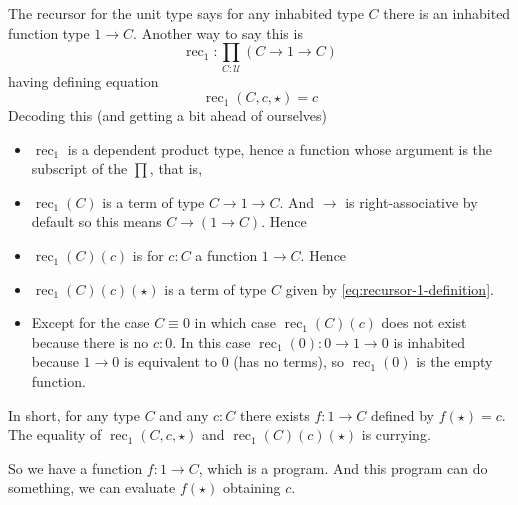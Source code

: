 \documentclass[11pt]{article}
\DeclareMathOperator{\recursor}{rec}
\newcommand{\universe}{\mathcal{U}}
\begin{document}
The recursor for the unit type says for any inhabited type $C$ there is an
inhabited function type $1 \to C$.  Another way to say this is
$$
   \recursor_1 : \prod_{C : \universe} (C \to 1 \to C)
$$
having defining equation
\begin{equation} \label{eq:recursor-1-definition}
   \recursor_1(C, c, \star) = c
\end{equation}
Decoding this (and getting a bit ahead of ourselves)
\begin{itemize}
\item $\recursor_1$ is a dependent product type, hence a function whose
    argument is the subscript of the $\prod$, that is,
\item $\recursor_1(C)$
    is a term of type $C \to 1 \to C$.  And $\to$ is right-associative
    by default so this means $C \to (1 \to C)$.  Hence
\item $\recursor_1(C)(c)$ is for $c : C$ a function $1 \to C$.  Hence
\item $\recursor_1(C)(c)(\star)$ is a term of type $C$ given by
    \eqref{eq:recursor-1-definition}.
\item Except for the case $C \equiv 0$ in which case
    $\recursor_1(C)(c)$ does not exist because there is no $c : 0$.
    In this case $\recursor_1(0) : 0 \to 1 \to 0$ is inhabited because
    $1 \to 0$ is equivalent to $0$ (has no terms), so $\recursor_1(0)$ is
    the empty function.
\end{itemize}
In short, for any type $C$ and any $c : C$
there exists $f : 1 \to C$ defined by $f(\star) = c$.
The equality of $\recursor_1(C, c, \star)$ and $\recursor_1(C)(c)(\star)$
is currying.

So we have a function $f : 1 \to C$, which is a program.  And this program
can do something, we can evaluate $f(\star)$ obtaining $c$.
\end{document}
